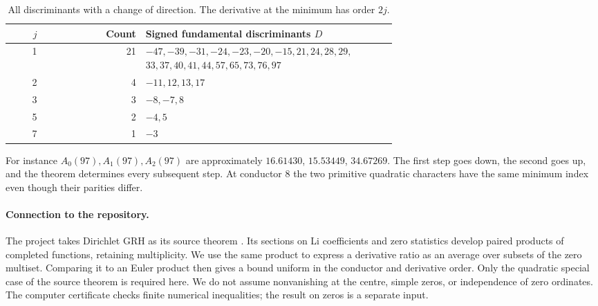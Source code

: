 \documentclass[11pt]{article}
\numberwithin{equation}{section}
\begin{document}
\begin{table}[ht]
\centering\small
\caption{All discriminants with a change of direction. The derivative at the minimum has order $2j$.}\label{tab:turns}
\begin{tabular}{@{}r r p{0.65\linewidth}@{}}
\toprule
$j$ & Count & Signed fundamental discriminants $D$\\
\midrule
1 & 21 & $-47,-39,-31,-24,-23,-20,-15,21,24,28,29,$ \newline $33,37,40,41,44,57,65,73,76,97$\\[2pt]
2 & 4 & $-11,12,13,17$\\
3 & 3 & $-8,-7,8$\\
5 & 2 & $-4,5$\\
7 & 1 & $-3$\\
\bottomrule
\end{tabular}
\end{table}

For instance $A_0(97),A_1(97),A_2(97)$ are approximately $16.61430$, $15.53449$, $34.67269$. The first step goes down, the second goes up, and the theorem determines every subsequent step. At conductor 8 the two primitive quadratic characters have the same minimum index even though their parities differ.

\paragraph{Connection to the repository.}
The project takes Dirichlet GRH as its source theorem \cite{repo}. Its sections on Li coefficients and zero statistics develop paired products of completed functions, retaining multiplicity. We use the same product to express a derivative ratio as an average over subsets of the zero multiset. Comparing it to an Euler product then gives a bound uniform in the conductor and derivative order. Only the quadratic special case of the source theorem is required here. We do not assume nonvanishing at the centre, simple zeros, or independence of zero ordinates. The computer certificate checks finite numerical inequalities; the result on zeros is a separate input.
\end{document}
